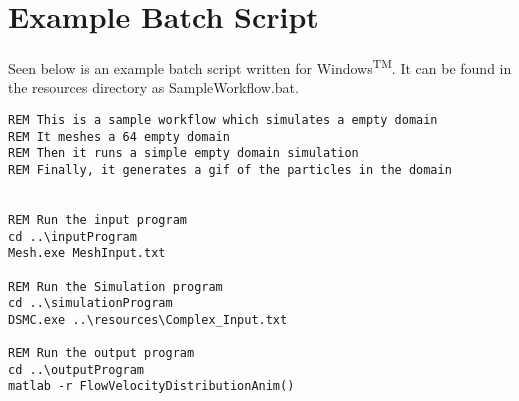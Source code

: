 \chapter{Example Batch Script}
\label{app:examplescript}
Seen below is an example batch script written for Windows\textsuperscript{TM}. It can be found in the resources directory as SampleWorkflow.bat. 

\begin{verbatim}
REM This is a sample workflow which simulates a empty domain
REM It meshes a 64 empty domain
REM Then it runs a simple empty domain simulation
REM Finally, it generates a gif of the particles in the domain


REM Run the input program
cd ..\inputProgram
Mesh.exe MeshInput.txt

REM Run the Simulation program
cd ..\simulationProgram
DSMC.exe ..\resources\Complex_Input.txt

REM Run the output program
cd ..\outputProgram
matlab -r FlowVelocityDistributionAnim()
\end{verbatim}


